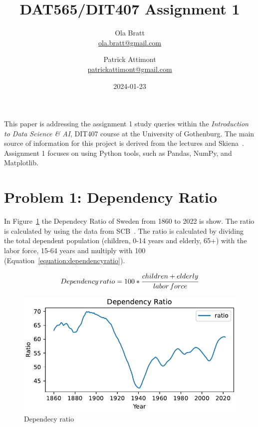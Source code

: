 \documentclass[a4paper]{article}
\begin{document}
\author{Ola Bratt \\
  \href{mailto:ola.bratt@gmail.com}{ola.bratt@gmail.com}
  \and
  Patrick Attimont \\
  \href{patrickattimont@gmail.com}{patrickattimont@gmail.com}
}

\title{DAT565/DIT407 Assignment 1}
\date{2024-01-23}

\maketitle

This paper is addressing the assignment 1 study queries within the \emph{Introduction to Data Science \& AI}, DIT407 course at 
the University of Gothenburg. The main source of information for this project
is derived from the lectures and Skiena~\cite{Skiena:2024}. Assignment 1 focuses on using Python tools, such as Pandas, NumPy, and Matplotlib. 

\section*{Problem 1: Dependency Ratio}

In Figure~\ref{fig:ratio} the Dependecy Ratio of Sweden from 1860 to 2022 is show.
The ratio is calculated by using the data from SCB~\cite{SCB:2023}. The ratio is calculated by dividing 
the total dependent population (children, 0-14 years  and elderly, 65+) with the labor force, 15-64 years and multiply with 100 (Equation~\ref{equation:dependencyratio}).


\begin{equation}
  \label{equation:dependencyratio}
  Dependency \thinspace ratio = 100 * \cfrac{ children + elderly}{labor \thinspace force}
\end{equation}

\begin{figure}[h]
  \begin{center}
    \includegraphics[width=\textwidth]{ratio.pdf}
    \caption{Dependecy ratio}
    \label{fig:ratio}
  \end{center}
\end{figure}
\end{document}
